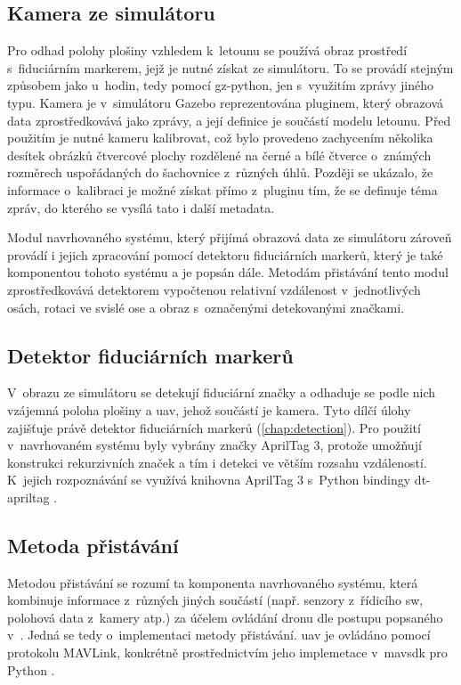     \subsection{Kamera ze simulátoru}
      Pro odhad polohy plošiny vzhledem k~letounu se používá obraz prostředí s~fiduciárním markerem, jejž je nutné získat ze simulátoru. To se provádí stejným způsobem jako u~hodin, tedy pomocí gz-python, jen s~využitím zprávy jiného typu. Kamera je v~simulátoru Gazebo reprezentována pluginem, který obrazová data zprostředkovává jako zprávy, a její definice je součástí modelu letounu. Před použitím je nutné kameru kalibrovat, což bylo provedeno zachycením několika desítek obrázků čtvercové plochy rozdělené na černé a bílé čtverce o~známých rozměrech uspořádaných do šachovnice z~různých úhlů. Později se ukázalo, že informace o~kalibraci je možné získat přímo z~pluginu tím, že se definuje téma zpráv, do kterého se vysílá tato i další metadata.

      Modul navrhovaného systému, který přijímá obrazová data ze simulátoru zároveň provádí i jejich zpracování pomocí detektoru fiduciárních markerů, který je také komponentou tohoto systému a je popsán dále. Metodám přistávání tento modul zprostředkovává detektorem vypočtenou relativní vzdálenost v~jednotlivých osách, rotaci ve svislé ose a obraz s~označenými detekovanými značkami.
    \subsection{Detektor fiduciárních markerů}
      V~obrazu ze simulátoru se detekují fiduciární značky a odhaduje se podle nich vzájemná poloha plošiny a \acrshort{uav}, jehož součástí je kamera. Tyto dílčí úlohy zajišťuje právě detektor fiduciárních markerů (\cref{chap:detection}). Pro použití v~navrhovaném systému byly vybrány značky AprilTag 3, protože umožňují konstrukci rekurzivních značek a tím i detekci ve větším rozsahu vzdáleností. K~jejich rozpoznávání se využívá knihovna AprilTag 3 \cite{apriltag3} s~Python bindingy dt-apriltag \cite{dt-apriltags}.
    \subsection{Metoda přistávání}
      Metodou přistávání se rozumí ta komponenta navrhovaného systému, která kombinuje informace z~různých jiných součástí (např. senzory z~řídicího \acrshort{sw}, polohová data z~kamery atp.) za účelem ovládání dronu dle postupu popsaného v~. Jedná se tedy o~implementaci metody přistávání. \Acrshort{uav} je ovládáno pomocí protokolu MAVLink, konkrétně prostřednictvím jeho implemetace v~mavsdk pro Python \cite{mavsdk}.
